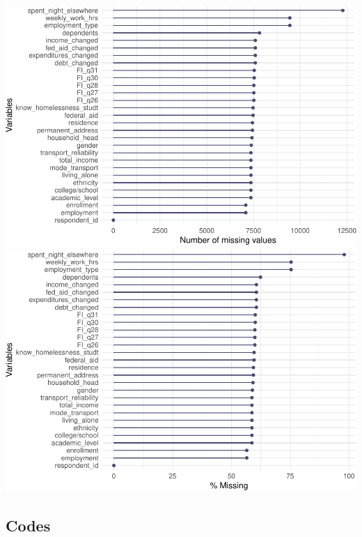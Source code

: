 \documentclass[
  10pt,
]{article}
\begin{document}
\includegraphics{phase1_report_files/figure-latex/unnamed-chunk-14-2}
\includegraphics{phase1_report_files/figure-latex/unnamed-chunk-14-3}

\hypertarget{codes}{%
\subsection{Codes}\label{codes}}
\end{document}
